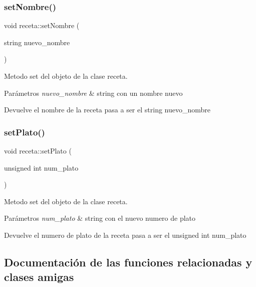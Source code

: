 \subsubsection{\texorpdfstring{set\+Nombre()}{setNombre()}}
{\footnotesize\ttfamily void receta\+::set\+Nombre (\begin{DoxyParamCaption}\item[{string}]{nuevo\+\_\+nombre }\end{DoxyParamCaption})}



Metodo set del objeto de la clase receta. 


\begin{DoxyParams}{Parámetros}
{\em nuevo\+\_\+nombre} & string con un nombre nuevo \\
\hline
\end{DoxyParams}
\begin{DoxyReturn}{Devuelve}
el nombre de la receta pasa a ser el string nuevo\+\_\+nombre 
\end{DoxyReturn}
\mbox{\label{classreceta_aee27803bfea82c0abaa31748dfec17ad}} 
\subsubsection{\texorpdfstring{set\+Plato()}{setPlato()}}
{\footnotesize\ttfamily void receta\+::set\+Plato (\begin{DoxyParamCaption}\item[{unsigned int}]{num\+\_\+plato }\end{DoxyParamCaption})}



Metodo set del objeto de la clase receta. 


\begin{DoxyParams}{Parámetros}
{\em num\+\_\+plato} & string con el nuevo numero de plato \\
\hline
\end{DoxyParams}
\begin{DoxyReturn}{Devuelve}
el numero de plato de la receta pasa a ser el unsigned int num\+\_\+plato 
\end{DoxyReturn}


\subsection{Documentación de las funciones relacionadas y clases amigas}
\mbox{\label{classreceta_a93def1190ead1b91d310359d61f831ff}} 
